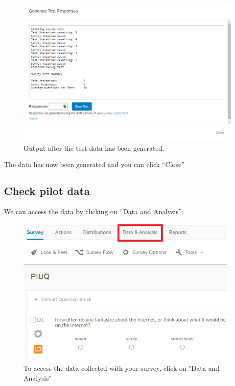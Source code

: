 \documentclass[
]{book}
\begin{document}
\begin{figure}

{\centering \includegraphics[width=0.85\linewidth]{images/Qualtrics/11testresponses3} 

}

\caption{Output after the test data has been generated.}\label{fig:Figure11-10}
\end{figure}

The data has now been generated and you can click ``Close''

\hypertarget{check-pilot-data}{%
\subsection{Check pilot data}\label{check-pilot-data}}

We can access the data by clicking on ``Data and Analysis'':

\begin{figure}

{\centering \includegraphics[width=0.85\linewidth]{images/Qualtrics/12checkdata1} 

}

\caption{To access the data collected with your survey, click on "Data and Analysis"}\label{fig:Figure11-11}
\end{figure}
\end{document}
